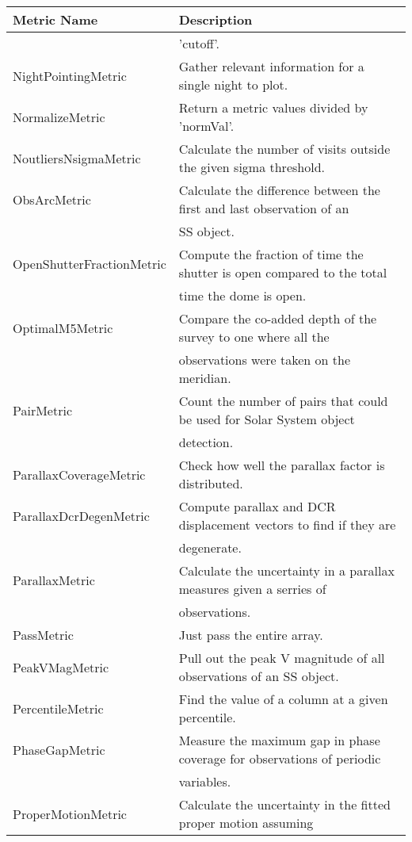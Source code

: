 \begin{table}
\scriptsize
\begin{tabular}{ll}
\hline
               Metric Name &                                                             Description \\
\hline
  &  'cutoff'. \\
 NightPointingMetric &  Gather relevant information for a single night to plot. \\
 NormalizeMetric &  Return a metric values divided by 'normVal'. \\
 NoutliersNsigmaMetric &  Calculate the number of visits outside the given sigma threshold. \\
 ObsArcMetric &  Calculate the difference between the first and last observation of an \\
  &  SS object. \\
 OpenShutterFractionMetric &  Compute the fraction of time the shutter is open compared to the total \\
  &  time the dome is open. \\
 OptimalM5Metric &  Compare the co-added depth of the survey to one where all the \\
  &  observations were taken on the meridian. \\
 PairMetric &  Count the number of pairs that could be used for Solar System object \\
  &  detection. \\
 ParallaxCoverageMetric &  Check how well the parallax factor is distributed. \\
 ParallaxDcrDegenMetric &  Compute parallax and DCR displacement vectors to find if they are \\
  &  degenerate. \\
 ParallaxMetric &  Calculate the uncertainty in a parallax measures given a serries of \\
  &  observations. \\
 PassMetric &  Just pass the entire array. \\
 PeakVMagMetric &  Pull out the peak V magnitude of all observations of an SS object. \\
 PercentileMetric &  Find the value of a column at a given percentile. \\
 PhaseGapMetric &  Measure the maximum gap in phase coverage for observations of periodic \\
  &  variables. \\
 ProperMotionMetric &  Calculate the uncertainty in the fitted proper motion assuming \\

\end{tabular}
\end{table}
